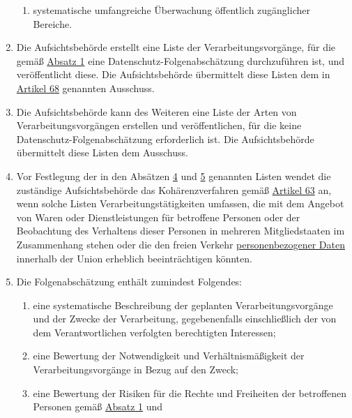 \begin{enumerate}
\begin{enumerate}
    \item systematische umfangreiche Überwachung öffentlich zugänglicher Bereiche.
    \label{itm:35-3c}

  \end{enumerate}

  \item Die Aufsichtsbehörde erstellt eine Liste der Verarbeitungsvorgänge, für die gemäß \hyperref[itm:35-1]{Absatz 1}
   eine Datenschutz-Folgenabschätzung durchzuführen ist, und veröffentlicht diese. Die Aufsichtsbehörde übermittelt
   diese Listen dem in \hyperref[ch:68]{Artikel 68} genannten Ausschuss.
  \label{itm:35-4}

  \item Die Aufsichtsbehörde kann des Weiteren eine Liste der Arten von Verarbeitungsvorgängen erstellen und
   veröffentlichen, für die keine Datenschutz-Folgenabschätzung erforderlich ist. Die Aufsichtsbehörde übermittelt
   diese Listen dem Ausschuss.
  \label{itm:35-5}

  \item Vor Festlegung der in den Absätzen \hyperref[itm:35-4]{4} und \hyperref[itm:35-5]{5} genannten Listen wendet die
   zuständige Aufsichtsbehörde das Kohärenzverfahren gemäß \hyperref[ch:63]{Artikel 63} an, wenn solche Listen
   Verarbeitungstätigkeiten umfassen, die mit dem Angebot von Waren oder Dienstleistungen für betroffene Personen oder
   der Beobachtung des Verhaltens dieser Personen in mehreren Mitgliedstaaten im Zusammenhang stehen oder die den
   freien Verkehr \hyperref[itm:04-1]{personenbezogener Daten} innerhalb der Union erheblich beeinträchtigen könnten.
  \label{itm:35-6}

  \item Die Folgenabschätzung enthält zumindest Folgendes:
  \label{itm:35-7}

  \begin{enumerate}
  
    \item eine systematische Beschreibung der geplanten Verarbeitungsvorgänge und der Zwecke der Verarbeitung,
     gegebenenfalls einschließlich der von dem Verantwortlichen verfolgten berechtigten Interessen;
    \label{itm:35-7a}

    \item eine Bewertung der Notwendigkeit und Verhältnismäßigkeit der Verarbeitungsvorgänge in Bezug auf den Zweck;
    \label{itm:35-7b}

    \item eine Bewertung der Risiken für die Rechte und Freiheiten der betroffenen Personen gemäß \hyperref[itm:35-1]
     {Absatz 1} und
    \label{itm:35-7c}


\end{enumerate}
\end{enumerate}
